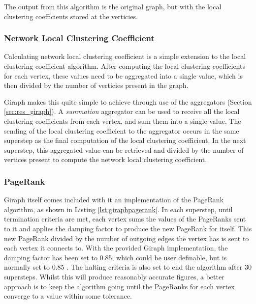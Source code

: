The output from this algorithm is the original graph, but with the local clustering coefficients stored at the verticies.

\subsubsection{Network Local Clustering Coefficient}
Calculating network local clustering coefficient is a simple extension to the local clustering coefficient algorithm. After computing the local clustering coefficients for each vertex, these values need to be aggregated into a single value, which is then divided by the number of verticies present in the graph.

Giraph makes this quite simple to achieve through use of the aggregators (Section \ref{sec:res_giraph}). A \emph{summation} aggregator can be used to receive all the local clustering coefficients from each vertex, and sum them into a single value. The sending of the local clustering coefficient to the aggregator occurs in the same superstep as the final computation of the local clustering coefficient. In the next superstep, this aggregated value can be retrieved and divided by the number of vertices present to compute the network local clustering coefficient.

\subsubsection{PageRank}
Giraph itself comes included with it an implementation of the PageRank algorithm, as shown in Listing \ref{lst:giraphpagerank}. In each superstep, until termination criteria are met, each vertex sums the values of the PageRanks sent to it and applies the damping factor to produce the new PageRank for itself. This new PageRank divided by the number of outgoing edges the vertex has is sent to each vertex it connects to. With the provided Giraph implementation, the damping factor has been set to 0.85, which could be user definable, but is normally set to 0.85 \cite{brin98}. The halting criteria is also set to end the algorithm after 30 supersteps. Whilst this will produce reasonably accurate figures, a better approach is to keep the algorithm going until the PageRanks for each vertex converge to a value within some tolerance.

